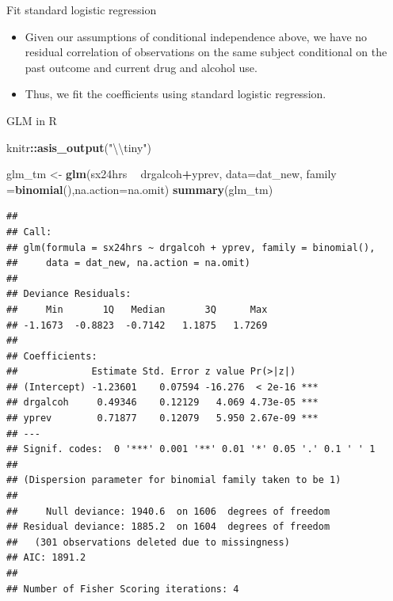 \documentclass[ignorenonframetext,]{beamer}
\newenvironment{Shaded}{\begin{snugshade}}{\end{snugshade}}
\newcommand{\KeywordTok}[1]{\textcolor[rgb]{0.13,0.29,0.53}{\textbf{#1}}}
\newcommand{\DataTypeTok}[1]{\textcolor[rgb]{0.13,0.29,0.53}{#1}}
\newcommand{\CharTok}[1]{\textcolor[rgb]{0.31,0.60,0.02}{#1}}
\newcommand{\StringTok}[1]{\textcolor[rgb]{0.31,0.60,0.02}{#1}}
\newcommand{\OperatorTok}[1]{\textcolor[rgb]{0.81,0.36,0.00}{\textbf{#1}}}
\newcommand{\NormalTok}[1]{#1}
\providecommand{\tightlist}{%
  \setlength{\itemsep}{0pt}\setlength{\parskip}{0pt}}
\begin{document}
\begin{frame}{Fit standard logistic regression}

\begin{itemize}
\tightlist
\item
  Given our assumptions of conditional independence above, we have no
  residual correlation of observations on the same subject conditional
  on the past outcome and current drug and alcohol use.
\item
  Thus, we fit the coefficients using standard logistic regression.
\end{itemize}

\end{frame}

\begin{frame}[fragile]{GLM in R}

\begin{Shaded}
\begin{Highlighting}[]
\NormalTok{knitr}\OperatorTok{::}\KeywordTok{asis_output}\NormalTok{(}\StringTok{"}\CharTok{\textbackslash{}\textbackslash{}}\StringTok{tiny"}\NormalTok{)}
\end{Highlighting}
\end{Shaded}

\tiny

\begin{Shaded}
\begin{Highlighting}[]
\NormalTok{glm_tm <-}\StringTok{ }\KeywordTok{glm}\NormalTok{(sx24hrs }\OperatorTok{~}\StringTok{ }\NormalTok{drgalcoh}\OperatorTok{+}\NormalTok{yprev, }\DataTypeTok{data=}\NormalTok{dat_new, }\DataTypeTok{family =}\KeywordTok{binomial}\NormalTok{(),}\DataTypeTok{na.action=}\NormalTok{na.omit)}
\KeywordTok{summary}\NormalTok{(glm_tm)}
\end{Highlighting}
\end{Shaded}

\begin{verbatim}
## 
## Call:
## glm(formula = sx24hrs ~ drgalcoh + yprev, family = binomial(), 
##     data = dat_new, na.action = na.omit)
## 
## Deviance Residuals: 
##     Min       1Q   Median       3Q      Max  
## -1.1673  -0.8823  -0.7142   1.1875   1.7269  
## 
## Coefficients:
##             Estimate Std. Error z value Pr(>|z|)    
## (Intercept) -1.23601    0.07594 -16.276  < 2e-16 ***
## drgalcoh     0.49346    0.12129   4.069 4.73e-05 ***
## yprev        0.71877    0.12079   5.950 2.67e-09 ***
## ---
## Signif. codes:  0 '***' 0.001 '**' 0.01 '*' 0.05 '.' 0.1 ' ' 1
## 
## (Dispersion parameter for binomial family taken to be 1)
## 
##     Null deviance: 1940.6  on 1606  degrees of freedom
## Residual deviance: 1885.2  on 1604  degrees of freedom
##   (301 observations deleted due to missingness)
## AIC: 1891.2
## 
## Number of Fisher Scoring iterations: 4
\end{verbatim}

\end{frame}
\end{document}
